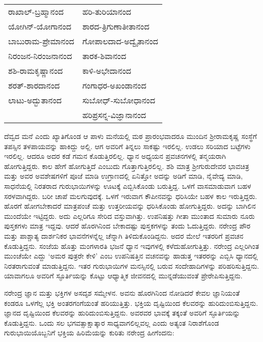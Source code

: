\begin{longtable}{ll}
ರಾಖಾಲ್-ಬ್ರಹ್ಮಾನಂದ & ಹರಿ-ತುರಿಯಾನಂದ \\
ಯೋಗಿನ್-ಯೋಗಾನಂದ & ಶಾರದ-ತ್ರಿಗುಣಾತೀತಾನಂದ \\
ಬಾಬುರಾಮ-ಪ್ರೇಮಾನಂದ & ಗೋಪಾಲದಾದ-ಅದ್ವೈತಾನಂದ \\
ನಿರಂಜನ-ನಿರಂಜನಾನಂದ & ತಾರಕ-ಶಿವಾನಂದ \\
ಶಶಿ-ರಾಮಕೃಷ್ಣಾನಂದ & ಕಾಳಿ-ಅಭೇದಾನಂದ \\
ಶರತ್-ಶಾರದಾನಂದ & ಗಂಗಾಧರ-ಅಖಂಡಾನಂದ \\
ಲಾಟು-ಅದ್ಭುತಾನಂದ & ಸುಬೋಧ್-ಸುಬೋಧಾನಂದ \\
 & ಹರಿಪ್ರಸನ್ನ-ವಿಜ್ಞಾನಾನಂದ \\
\end{longtable}

ದೆವ್ವದ ಮನೆ ಎಂದು ಖ್ಯಾತಿಗೊಂಡ ಆ ಪಾಳು ಮನೆಯಲ್ಲಿ ಮಠ ಪ್ರಾರಂಭವಾದರೂ ಮುಂದಿನ ಶ‍್ರೀರಾಮಕೃಷ್ಣ ಸಂಸ್ಥೆಗೆ ತಪಸ್ಸಿನ ತಳಪಾಯವನ್ನು ಹಾಕಿದ್ದು ಅಲ್ಲಿ. ಆಗ ಅವರಿಗೆ ತಿನ್ನಲು ಸಾಕಷ್ಟು ಇರಲಿಲ್ಲ. ಉಡಲು ಸರಿಯಾದ ಬಟ್ಟೆಗಳು ಇರಲಿಲ್ಲ. ಆದರೂ ಅದರ ಕಡೆ ಗಮನ ಕೊಡುತ್ತಿರಲಿಲ್ಲ. ಧ್ಯಾನ ಅಧ್ಯಯನ ಪ್ರವಚನಗಳಲ್ಲಿ ತನ್ಮಯರಾಗಿ ಹೋಗುತ್ತಿದ್ದರು. ಕಾಲ ಹೇಗೆ ಹೋಗುತ್ತಿದೆ ಎಂಬುದು ಗೊತ್ತಾಗುತ್ತಿರಲಿಲ್ಲ. ಶಶಿ ಮಾತ್ರ ಶ‍್ರೀಗುರುದೇವರ ಭಾವಚಿತ್ರ ಮತ್ತು ಅವರ ಅವಶೇಷಗಳಿಗೆ ಪೂಜೆ ಮಾಡಿ ಉಗ್ರಾಣದಲ್ಲಿ ಏನಿತ್ತೋ ಅದನ್ನು ಅಡಿಗೆ ಮಾಡಿ, ನೈವೇದ್ಯ ಮಾಡಿ, ಸಾಧನೆಯಲ್ಲಿ ನಿರತರಾದ ಗುರುಭಾಯಿಗಳನ್ನು ಊಟಕ್ಕೆ ಎಬ್ಬಿಸಿಕೊಂಡು ಬರುತ್ತಿದ್ದ. ಒಳಗೆ ವಾಸಮಾಡುವಾಗ ಬಹಳ ಸರಳವಾಗಿದ್ದರು. ಬರೀ ಚಾಪೆ ಮಲಗುವುದಕ್ಕೆ. ಒಳಗೆ ಇರುವಾಗ ಕೌಪೀನವನ್ನು ಧರಿಸಿಯೇ ಬಹಳ ಕಾಲ ಇರುತ್ತಿದ್ದರು. ಹೊರಗೆ ಹೋಗಬೇಕಾದರೆ ಮಾತ್ರಪಂಚೆ ಮತ್ತು ಉತ್ತರೀಯವನ್ನು ಧರಿಸಿಕೊಂಡು ಹೋಗುತ್ತಿದ್ದರು. ಅದನ್ನು ಬಾಗಿಲಿನ ಮುಂದೆಯೇ ಇಟ್ಟಿದ್ದರು. ಅದು ಎಲ್ಲರಿಗೂ ಸೇರಿದ ವಸ್ತುವಾಗಿತ್ತು. ಉಪನಿಷತ್ತು ಗೀತಾ ಮುಂತಾದ ಸುಮಾರು ನೂರು ಪುಸ್ತಕಗಳು ಮಾತ್ರ ಇದ್ದವು. ಆದರೆ ಹೊರಗಿನಿಂದ ಬೇಕಾದಷ್ಟು ಪುಸ್ತಕಗಳನ್ನು ತಂದು ಓದುತ್ತಿದ್ದರು. ನರೇಂದ್ರ ಪೌರ ಮತ್ತು ಪಾಶ್ಚಾತ್ಯ ದಾರ್ಶನಿಕರ ಭಾವನೆಗಳನ್ನೆಲ್ಲ ಚೆನ್ನಾಗಿ ತಿಳಿದುಕೊಂಡಿದ್ದನು. ಅದರ ಮೇಲೆ ಇತರರಿಗೆ ಪ್ರವಚನ ಕೊಡುತ್ತಿದ್ದನು. ಸಂಜೆಯ ಹೊತ್ತು ಮಂಗಳಾರತಿ ಭಜನೆ ಧ್ಯಾನ ಇವುಗಳಲ್ಲಿ ಕಳೆದುಹೋಗುತ್ತಿತ್ತು. ನರೇಂದ್ರ ಎಲ್ಲರಿಗಿಂತ ಮುಂಚೆಯೇ ಎದ್ದು ‘ಅಮರ ಪುತ್ರರೇ ಕೇಳಿ’ ಎಂಬ ಉಪನಿಷತ್ತಿನ ವಚನವನ್ನು ಹಾಡುತ್ತ ಇತರರನ್ನು ಎಬ್ಬಿಸಿ ಧ್ಯಾನದಲ್ಲಿ ನಿರತರಾಗುವಂತೆ ಮಾಡುತ್ತಿದ್ದನು. ಇತರ ಗುರುಭಾಯಿಗಳ ಮನಸ್ಸಿನಲ್ಲಿ ಬರುವ ಸಂದೇಹಾದಿಗಳನ್ನು ಪರಿಹರಿಸುತ್ತಿದ್ದನು. ಯಾವಾಗಲೂ ಅವರಿಗೆ ಸ್ಫೂರ್ತಿಯನ್ನು ಕೊಟ್ಟು ಆಧ್ಯಾತ್ಮಿಕ ಜೀವನದಲ್ಲಿ ಮುನ್ನಡೆಯುವಂತೆ ಪ್ರೇರೇಪಿಸುತ್ತಿದ್ದನು.

ನರೇಂದ್ರ ಜ್ಞಾನ ಮತ್ತು ಭಕ್ತಿಗಳ ಅಸದೃಶ ಸಮ್ಮೇಳನ. ಅವನು ಹೊರಗಿನಿಂದ ನೋಡಿದರೆ ಕೇವಲ ಜ್ಞಾನಿಯಂತೆ ಕಂಡರೂ ಒಳಗೆಲ್ಲ ಭಕ್ತಿ ಅಂತರಗಂಗೆಯಂತೆ ಹರಿಯುತ್ತಿತ್ತು. ಭಕ್ತಿಯ ದೃಷ್ಟಿಯಿಂದ ಕೆಲವರನ್ನು ಹುರಿದುಂಬಿಸುತ್ತಿದ್ದನು. ಜ್ಞಾನದ ದೃಷ್ಟಿಯಿಂದ ಕೆಲವರನ್ನು ಹುರಿದುಂಬಿಸುತ್ತಿದ್ದನು. ಅವರವರ ಭಾವಕ್ಕೆ ತಕ್ಕಂತೆ ಅವರಿಗೆ ಸ್ಫೂರ್ತಿಯನ್ನು ಕೊಡುತ್ತಿದ್ದನು. ಒಂದು ಸಲ ಭಗವತ್ಸಾಕ್ಷಾತ್ಕಾರ ಸಾಧ್ಯವಾಗಲಿಲ್ಲವಲ್ಲ ಎಂದು ಅತ್ಯಂತ ನಿರಾಶೆಗೊಂಡ ಗುರುಭಾಯಿಯೊಬ್ಬನಿಗೆ ಭಕ್ತಿಯ ಹಿರಿಮೆಯನ್ನು ಕುರಿತು ನರೇಂದ್ರ ಹೀಗೆಂದನು:

